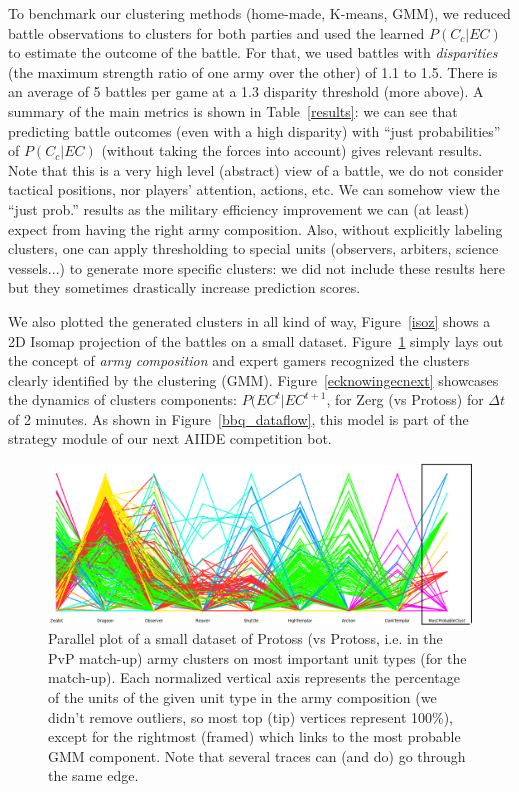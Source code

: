To benchmark our clustering methods (home-made, K-means, GMM), we reduced battle observations to clusters for both parties and used the learned $P(C_c|EC)$ to estimate the outcome of the battle. For that, we used battles with \textit{disparities} (the maximum strength ratio of one army over the other) of 1.1 to 1.5. There is an average of 5 battles per game at a 1.3 disparity threshold (more above). A summary of the main metrics is shown in Table~\ref{results}: we can see that predicting battle outcomes (even with a high disparity) with ``just probabilities'' of $P(C_c|EC)$ (without taking the forces into account) gives relevant results. Note that this is a very high level (abstract) view of a battle, we do not consider tactical positions, nor players' attention, actions, etc. We can somehow view the ``just prob.'' results as the military efficiency improvement we can (at least) expect from having the right army composition. Also, without explicitly labeling clusters, one can apply thresholding to special units (observers, arbiters, science vessels...) to generate more specific clusters: we did not include these results here but they sometimes drastically increase prediction scores.

We also plotted the generated clusters in all kind of way, Figure~\ref{isoz} shows a 2D Isomap projection of the battles on a small dataset. Figure~\ref{parallelplot} simply lays out the concept of \textit{army composition} and expert gamers recognized the clusters clearly identified by the clustering (GMM). Figure~\ref{ecknowingecnext} showcases the dynamics of clusters components: $P(EC^t|EC^{t+1}$, for Zerg (vs Protoss) for $\Delta t$ of 2 minutes. As shown in Figure~\ref{bbq_dataflow}, this model is part of the strategy module of our next AIIDE competition bot.

\begin{figure}[htp]
\centerline{\includegraphics[width=0.7\columnwidth]{images/PvP_small.png}}
\caption{Parallel plot of a small dataset of Protoss (vs Protoss, i.e. in the PvP match-up) army clusters on most important unit types (for the match-up). Each normalized vertical axis represents the percentage of the units of the given unit type in the army composition (we didn't remove outliers, so most top (tip) vertices represent 100\%), except for the rightmost (framed) which links to the most probable GMM component. Note that several traces can (and do) go through the same edge.}
\label{parallelplot}
\end{figure}



